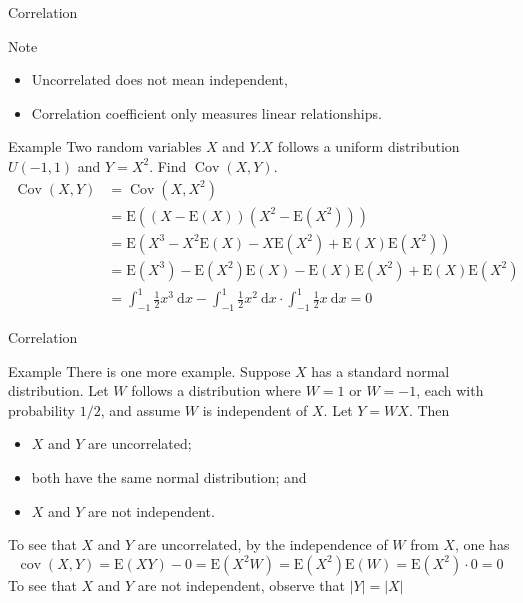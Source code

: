 \documentclass{beamer}
\begin{document}
\begin{frame}{Correlation}
\begin{block}{Note}
\begin{itemize}
\item Uncorrelated does not mean independent,
\item Correlation coefficient only measures linear relationships.
\end{itemize}
\end{block}
\begin{block}{Example}
Two random variables $X$ and $Y . X$ follows a uniform distribution $U(-1,1)$ and $Y=X^{2}$. Find $\operatorname{Cov}(X, Y)$.
$$
\begin{aligned}
\operatorname{Cov}(X, Y) &=\operatorname{Cov}\left(X, X^{2}\right) \\
&=\mathrm{E}\left((X-\mathrm{E}(X))\left(X^{2}-\mathrm{E}\left(X^{2}\right)\right)\right) \\
&=\mathrm{E}\left(X^{3}-X^{2} \mathrm{E}(X)-X \mathrm{E}\left(X^{2}\right)+\mathrm{E}(X) \mathrm{E}\left(X^{2}\right)\right) \\
&=\mathrm{E}\left(X^{3}\right)-\mathrm{E}\left(X^{2}\right) \mathrm{E}(X)-\mathrm{E}(X) \mathrm{E}\left(X^{2}\right)+\mathrm{E}(X) \mathrm{E}\left(X^{2}\right) \\
&=\int_{-1}^{1} \frac{1}{2} x^{3} \mathrm{~d} x-\int_{-1}^{1} \frac{1}{2} x^{2} \mathrm{~d} x \cdot \int_{-1}^{1} \frac{1}{2} x \mathrm{~d} x =0
\end{aligned}
$$
\end{block}
\end{frame}

\begin{frame}{Correlation}
\begin{block}{Example}
There is one more example. Suppose $X$ has a standard normal distribution. Let $W$ follows a distribution where $W=1$ or $W=-1$, each with probability $1 / 2$, and assume $W$ is independent of $X .$ Let $Y=W X$. Then
\begin{itemize}
\item $X$ and $Y$ are uncorrelated;
\item both have the same normal distribution; and
\item $X$ and $Y$ are not independent.
\end{itemize}

To see that $X$ and $Y$ are uncorrelated, by the independence of $W$ from $X$, one has
$$
\operatorname{cov}(X, Y)=\mathrm{E}(X Y)-0=\mathrm{E}\left(X^{2} W\right)=\mathrm{E}\left(X^{2}\right) \mathrm{E}(W)=\mathrm{E}\left(X^{2}\right) \cdot 0=0
$$
To see that $X$ and $Y$ are not independent, observe that $|Y|=|X|$
\end{block}
\end{frame}
\end{document}
